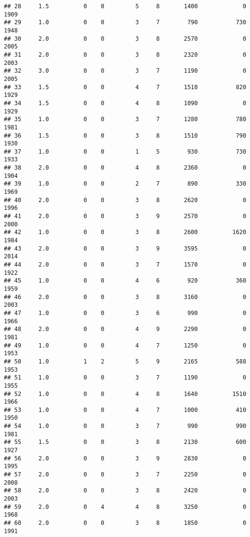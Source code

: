 \documentclass[
]{article}
\begin{document}
\begin{verbatim}
## 28     1.5          0    0         5     8       1400             0     1909
## 29     1.0          0    0         3     7        790           730     1948
## 30     2.0          0    0         3     8       2570             0     2005
## 31     2.0          0    0         3     8       2320             0     2003
## 32     3.0          0    0         3     7       1190             0     2005
## 33     1.5          0    0         4     7       1510           820     1929
## 34     1.5          0    0         4     8       1090             0     1929
## 35     1.0          0    0         3     7       1280           780     1981
## 36     1.5          0    0         3     8       1510           790     1930
## 37     1.0          0    0         1     5        930           730     1933
## 38     2.0          0    0         4     8       2360             0     1904
## 39     1.0          0    0         2     7        890           330     1969
## 40     2.0          0    0         3     8       2620             0     1996
## 41     2.0          0    0         3     9       2570             0     2000
## 42     1.0          0    0         3     8       2600          1620     1984
## 43     2.0          0    0         3     9       3595             0     2014
## 44     2.0          0    0         3     7       1570             0     1922
## 45     1.0          0    0         4     6        920           360     1959
## 46     2.0          0    0         3     8       3160             0     2003
## 47     1.0          0    0         3     6        990             0     1966
## 48     2.0          0    0         4     9       2290             0     1981
## 49     1.0          0    0         4     7       1250             0     1953
## 50     1.0          1    2         5     9       2165           588     1953
## 51     1.0          0    0         3     7       1190             0     1955
## 52     1.0          0    0         4     8       1640          1510     1966
## 53     1.0          0    0         4     7       1000           410     1950
## 54     1.0          0    0         3     7        990           990     1981
## 55     1.5          0    0         3     8       2130           600     1927
## 56     2.0          0    0         3     9       2830             0     1995
## 57     2.0          0    0         3     7       2250             0     2008
## 58     2.0          0    0         3     8       2420             0     2003
## 59     2.0          0    4         4     8       3250             0     1968
## 60     2.0          0    0         3     8       1850             0     1991

\end{verbatim}
\end{document}

